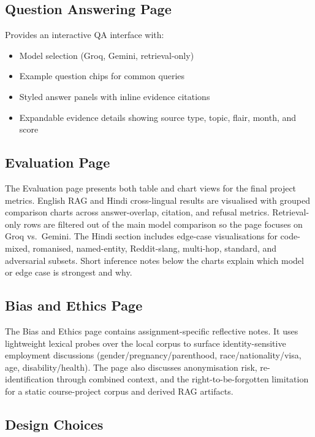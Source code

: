 \documentclass[11pt,a4paper]{article}
\begin{document}
\subsection{Question Answering Page}

Provides an interactive QA interface with:
\begin{itemize}[leftmargin=*]
  \item Model selection (Groq, Gemini, retrieval-only)
  \item Example question chips for common queries
  \item Styled answer panels with inline evidence citations
  \item Expandable evidence details showing source type, topic, flair, month, and score
\end{itemize}

\subsection{Evaluation Page}

The Evaluation page presents both table and chart views for the final project metrics. English RAG and Hindi cross-lingual results are visualised with grouped comparison charts across answer-overlap, citation, and refusal metrics. Retrieval-only rows are filtered out of the main model comparison so the page focuses on Groq vs.\ Gemini. The Hindi section includes edge-case visualisations for code-mixed, romanised, named-entity, Reddit-slang, multi-hop, standard, and adversarial subsets. Short inference notes below the charts explain which model or edge case is strongest and why.

\subsection{Bias and Ethics Page}

The Bias and Ethics page contains assignment-specific reflective notes. It uses lightweight lexical probes over the local corpus to surface identity-sensitive employment discussions (gender/pregnancy/parenthood, race/nationality/visa, age, disability/health). The page also discusses anonymisation risk, re-identification through combined context, and the right-to-be-forgotten limitation for a static course-project corpus and derived RAG artifacts.

\subsection{Design Choices}
\end{document}
